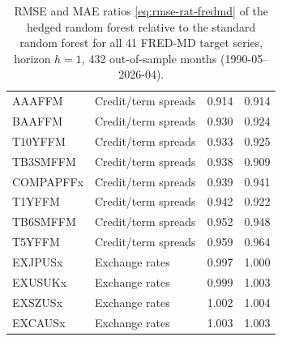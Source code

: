 \begin{table}[ht]
\begin{tabular}{llrr}
AAAFFM & Credit/term spreads & 0.914 & 0.914 \\
BAAFFM & Credit/term spreads & 0.930 & 0.924 \\
T10YFFM & Credit/term spreads & 0.933 & 0.925 \\
TB3SMFFM & Credit/term spreads & 0.938 & 0.909 \\
COMPAPFFx & Credit/term spreads & 0.939 & 0.941 \\
T1YFFM & Credit/term spreads & 0.942 & 0.922 \\
TB6SMFFM & Credit/term spreads & 0.952 & 0.948 \\
T5YFFM & Credit/term spreads & 0.959 & 0.964 \\
EXJPUSx & Exchange rates & 0.997 & 1.000 \\
EXUSUKx & Exchange rates & 0.999 & 1.003 \\
EXSZUSx & Exchange rates & 1.002 & 1.004 \\
EXCAUSx & Exchange rates & 1.003 & 1.003 \\
\bottomrule
\end{tabular}
\endgroup
\caption{RMSE and MAE ratios \eqref{eq:rmse-rat-fredmd} of the hedged random forest relative to the standard random forest for all 41 FRED-MD target series, horizon $h=1$, 432 out-of-sample months (1990-05--2026-04).}
\label{tab:fredmd-detail}
\end{table}
